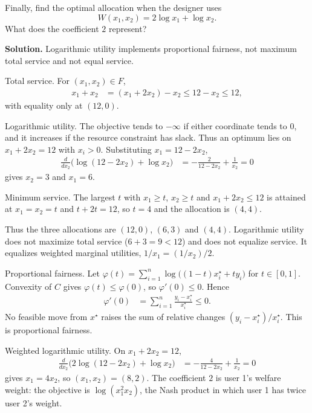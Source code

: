 \documentclass[11pt]{article}
\begin{document}
\begin{enumerate}[label=\arabic*., leftmargin=1.6em]
\begin{enumerate}
Finally, find the optimal allocation when the designer uses
\[
W(x_{1},x_{2})=2\log x_{1}+\log x_{2}.
\]
What does the coefficient $2$ represent?

\textbf{Solution.}
Logarithmic utility implements proportional fairness, not maximum total service and not equal service.

Total service. For \((x_{1},x_{2})\in F\),
\begin{align*}
x_{1}+x_{2}
&= (x_{1}+2x_{2})-x_{2}
\le 12-x_{2}
\le 12,
\end{align*}
with equality only at \((12,0)\).

Logarithmic utility. The objective tends to \(-\infty\) if either coordinate tends to \(0\), and it increases if the resource constraint has slack. Thus an optimum lies on \(x_{1}+2x_{2}=12\) with \(x_{i}>0\). Substituting \(x_{1}=12-2x_{2}\),
\begin{align*}
\frac{d}{dx_{2}}\bigl(\log(12-2x_{2})+\log x_{2}\bigr)
&= -\frac{2}{12-2x_{2}}+\frac{1}{x_{2}}
= 0
\end{align*}
gives \(x_{2}=3\) and \(x_{1}=6\).

Minimum service. The largest \(t\) with \(x_{1}\ge t\), \(x_{2}\ge t\) and \(x_{1}+2x_{2}\le 12\) is attained at \(x_{1}=x_{2}=t\) and \(t+2t=12\), so \(t=4\) and the allocation is \((4,4)\).

Thus the three allocations are \((12,0)\), \((6,3)\) and \((4,4)\). Logarithmic utility does not maximize total service (\(6+3=9<12\)) and does not equalize service. It equalizes weighted marginal utilities, \(1/x_{1}=(1/x_{2})/2\).

Proportional fairness. Let \(\varphi(t)=\sum_{i=1}^{n}\log\bigl((1-t)x^{\star}_{i}+ty_{i}\bigr)\) for \(t\in[0,1]\). Convexity of \(C\) gives \(\varphi(t)\le\varphi(0)\), so \(\varphi'(0)\le 0\). Hence
\begin{align*}
\varphi'(0)
&= \sum_{i=1}^{n}\frac{y_{i}-x^{\star}_{i}}{x^{\star}_{i}}
\le 0.
\end{align*}
No feasible move from \(x^{\star}\) raises the sum of relative changes \((y_{i}-x^{\star}_{i})/x^{\star}_{i}\). This is proportional fairness.

Weighted logarithmic utility. On \(x_{1}+2x_{2}=12\),
\begin{align*}
\frac{d}{dx_{2}}\bigl(2\log(12-2x_{2})+\log x_{2}\bigr)
&= -\frac{4}{12-2x_{2}}+\frac{1}{x_{2}}
= 0
\end{align*}
gives \(x_{1}=4x_{2}\), so \((x_{1},x_{2})=(8,2)\). The coefficient \(2\) is user 1's welfare weight: the objective is \(\log(x_{1}^{2}x_{2})\), the Nash product in which user 1 has twice user 2's weight.


\end{enumerate}
\end{enumerate}
\end{document}
